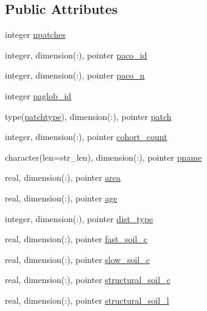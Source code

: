 \subsection*{Public Attributes}
\begin{DoxyCompactItemize}
\item 
integer \hyperlink{structed__state__vars_1_1sitetype_a3225f7a2a86ac1667828ea13baea3d32}{npatches}
\item 
integer, dimension(\+:), pointer \hyperlink{structed__state__vars_1_1sitetype_a22d10e38290ca0045355f9f9e887087d}{paco\+\_\+id}
\item 
integer, dimension(\+:), pointer \hyperlink{structed__state__vars_1_1sitetype_a07aabc20329d63b94c72ee5a6b7ef9a8}{paco\+\_\+n}
\item 
integer \hyperlink{structed__state__vars_1_1sitetype_ae3b8d3e3d980ea2b191f93ab1f82e9f9}{paglob\+\_\+id}
\item 
type(\hyperlink{structed__state__vars_1_1patchtype}{patchtype}), dimension(\+:), pointer \hyperlink{structed__state__vars_1_1sitetype_ac30e2f95dffb30b79f08015e516862d7}{patch}
\item 
integer, dimension(\+:), pointer \hyperlink{structed__state__vars_1_1sitetype_ae6d021b9276180c0e18f156eb6cb7a8a}{cohort\+\_\+count}
\item 
character(len=str\+\_\+len), dimension(\+:), pointer \hyperlink{structed__state__vars_1_1sitetype_a7c8646ba25493f8550339cba82460314}{pname}
\item 
real, dimension(\+:), pointer \hyperlink{structed__state__vars_1_1sitetype_a1eed035f74d70000625fcc1597421d7f}{area}
\item 
real, dimension(\+:), pointer \hyperlink{structed__state__vars_1_1sitetype_a9fdfcfd47bf3e35de24d6d33577e3d7a}{age}
\item 
integer, dimension(\+:), pointer \hyperlink{structed__state__vars_1_1sitetype_acffb89bf0a94adcc688459f3d1e9092e}{dist\+\_\+type}
\item 
real, dimension(\+:), pointer \hyperlink{structed__state__vars_1_1sitetype_a78c6be9b7312fa36799d4c386c4a283c}{fast\+\_\+soil\+\_\+c}
\item 
real, dimension(\+:), pointer \hyperlink{structed__state__vars_1_1sitetype_ab188c091858cc0306eef90d3ca0d10ce}{slow\+\_\+soil\+\_\+c}
\item 
real, dimension(\+:), pointer \hyperlink{structed__state__vars_1_1sitetype_aee8bee977f25a60319784ce6ee94ff54}{structural\+\_\+soil\+\_\+c}
\item 
real, dimension(\+:), pointer \hyperlink{structed__state__vars_1_1sitetype_a9c255d95042c70673bac939d49464334}{structural\+\_\+soil\+\_\+l}

\end{DoxyCompactItemize}
